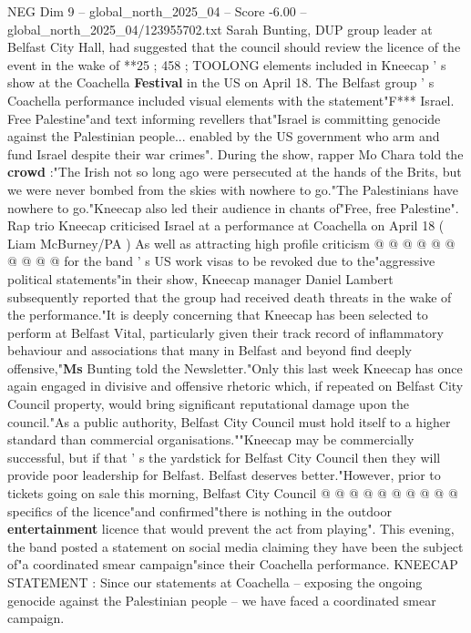 \begin{textsample}{NEG Dim 9 – global\_north\_2025\_04 – Score -6.00 – global\_north\_2025\_04/123955702.txt}  \label{ex:f9_neg_130}
Sarah Bunting, DUP group leader at Belfast City Hall, had suggested that the council should review the licence of the event in the wake of **25 ; 458 ; TOOLONG elements included in Kneecap ' s show at the Coachella \textbf{Festival} in the US on April 18.
The Belfast group ' s Coachella performance included visual elements with the statement"F*** Israel.
Free Palestine"and text informing revellers that"Israel is committing genocide against the Palestinian people... enabled by the US government who arm and fund Israel despite their war crimes".
During the show, rapper Mo Chara told the \textbf{crowd} :"The Irish not so long ago were persecuted at the hands of the Brits, but we were never bombed from the skies with nowhere to go."The Palestinians have nowhere to go."Kneecap also led their audience in chants of"Free, free Palestine".
Rap trio Kneecap criticised Israel at a performance at Coachella on April 18 ( Liam McBurney/PA ) As well as attracting high profile criticism @ @ @ @ @ @ @ @ @ @ for the band ' s US work visas to be revoked due to the"aggressive political statements"in their show, Kneecap manager Daniel Lambert subsequently reported that the group had received death threats in the wake of the performance."It is deeply concerning that Kneecap has been selected to perform at Belfast Vital, particularly given their track record of inflammatory behaviour and associations that many in Belfast and beyond find deeply offensive,"\textbf{Ms} Bunting told the Newsletter."Only this last week Kneecap has once again engaged in divisive and offensive rhetoric which, if repeated on Belfast City Council property, would bring significant reputational damage upon the council."As a public authority, Belfast City Council must hold itself to a higher standard than commercial organisations.""Kneecap may be commercially successful, but if that ' s the yardstick for Belfast City Council then they will provide poor leadership for Belfast.
Belfast deserves better."However, prior to tickets going on sale this morning, Belfast City Council @ @ @ @ @ @ @ @ @ @ specifics of the licence"and confirmed"there is nothing in the outdoor \textbf{entertainment} licence that would prevent the act from playing".
This evening, the band posted a statement on social media claiming they have been the subject of"a coordinated smear campaign"since their Coachella performance.
KNEECAP STATEMENT : Since our statements at Coachella -- exposing the ongoing genocide against the Palestinian people -- we have faced a coordinated smear campaign.

\end{textsample}
